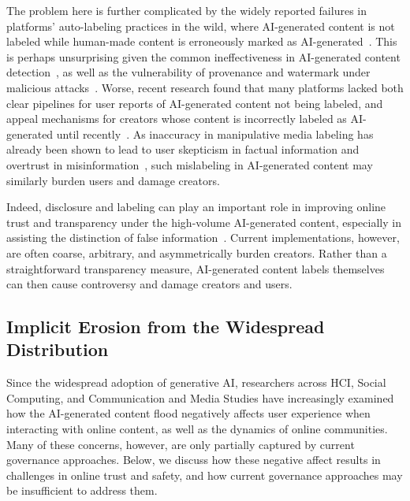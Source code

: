 The problem here is further complicated by the widely reported failures in platforms' auto-labeling practices in the wild, where AI-generated content is not labeled while human-made content is erroneously marked as AI-generated~\cite{mantzarlis_dutta_2025, kuiperslabeling}. This is perhaps unsurprising given the common ineffectiveness in AI-generated content detection~\cite{boutadjine2025human, weber2023testing}, as well as the vulnerability of provenance and watermark under malicious attacks~\cite{jiang2023evading}. Worse, recent research found that many platforms lacked both clear pipelines for user reports of AI-generated content not being labeled, and appeal mechanisms for creators whose content is incorrectly labeled as AI-generated until recently~\cite{gao2026governance}. As inaccuracy in manipulative media labeling has already been shown to lead to user skepticism in factual information and overtrust in misinformation~\cite{sherman2021designing}, such mislabeling in AI-generated content may similarly burden users and damage creators.

Indeed, disclosure and labeling can play an important role in improving online trust and transparency under the high-volume AI-generated content, especially in assisting the distinction of false information~\cite{wittenberg2025labeling, Wittenberg2024Labeling}. Current implementations, however, are often coarse, arbitrary, and asymmetrically burden creators. Rather than a straightforward transparency measure, AI-generated content labels themselves can then cause controversy and damage creators and users.


\subsection{Implicit Erosion from the Widespread Distribution}
\label{subsec:implicit}
Since the widespread adoption of generative AI, researchers across HCI, Social Computing, and Communication and Media Studies have increasingly examined how the AI-generated content flood negatively affects user experience when interacting with online content, as well as the dynamics of online communities. Many of these concerns, however, are only partially captured by current governance approaches. Below, we discuss how these negative affect results in challenges in online trust and safety, and how current governance approaches may be insufficient to address them.

